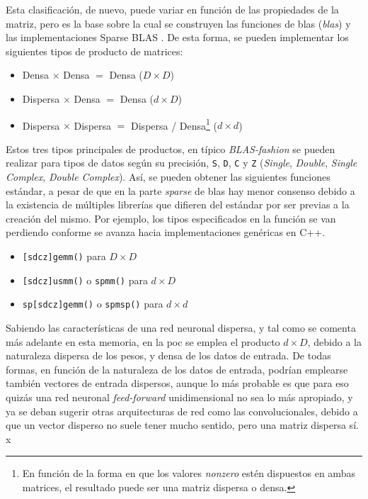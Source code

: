 Esta clasificación, de nuevo, puede variar en función de las propiedades de la matriz, pero es la base sobre la cual se construyen las funciones de \acrshort{blas} (\textit{\acrlong{blas}}) \cite{netlib_blas} y las implementaciones Sparse BLAS \cite{sparse_blas_10.1145/567806.567810}. De esta forma, se pueden implementar los siguientes tipos de producto de matrices:

\begin{itemize}
    \item Densa $\times$ Densa $=$ Densa ($D\times D$)
    \item Dispersa $\times$ Densa $=$ Densa ($d\times D$)
    \item Dispersa $\times$ Dispersa $=$ Dispersa / Densa\footnote{En función de la forma en que los valores \textit{nonzero} estén dispuestos en ambas matrices, el resultado puede ser una matriz dispersa o densa.} ($d\times d$)
\end{itemize}

Estos tres tipos principales de productos, en típico \textit{BLAS-fashion} se pueden realizar para tipos de datos según su precisión, \texttt{S}, \texttt{D}, \texttt{C} y \texttt{Z} (\textit{Single}, \textit{Double}, \textit{Single Complex}, \textit{Double Complex}).
Así, se pueden obtener las siguientes funciones estándar, a pesar de que en la parte \textit{sparse} de \acrshort{blas} hay menor consenso debido a la existencia de múltiples librerías que difieren del estándar por ser previas a la creación del mismo. Por ejemplo, los tipos especificados en la función se van perdiendo conforme se avanza hacia implementaciones genéricas en C++.

\begin{itemize}
    \item \texttt{[sdcz]gemm()} para $D\times D$
    \item \texttt{[sdcz]usmm()} o \texttt{spmm()} para $d\times D$
    \item \texttt{sp[sdcz]gemm()} o \texttt{spmsp()} para $d\times d$
\end{itemize}

Sabiendo las características de una red neuronal dispersa, y tal como se comenta más adelante en esta memoria, en la \acrshort{poc} se emplea el producto $d\times D$, debido a la naturaleza dispersa de los pesos, y densa de los datos de entrada. De todas formas, en función de la naturaleza de los datos de entrada, podrían emplearse también vectores de entrada dispersos, aunque lo más probable es que para eso quizás una red neuronal \textit{feed-forward} unidimensional no sea lo más apropiado, y ya se deban sugerir otras arquitecturas de red como las convolucionales, debido a que un vector disperso no suele tener mucho sentido, pero una matriz dispersa sí.
x
